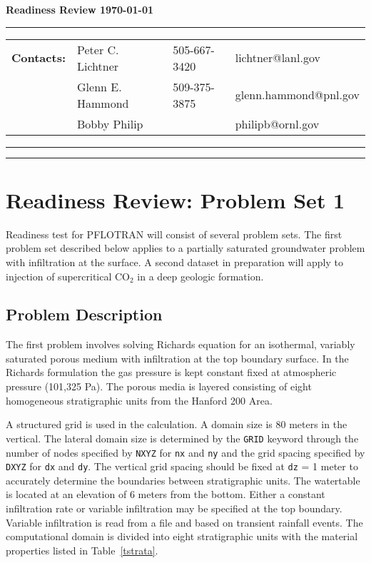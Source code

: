\documentclass[12pt]{article}
\newcommand{\longline}{\noindent\rule[-0.1in]{\textwidth}{0.01in}}
\begin{document}
{\bf\Large Readiness Review \hfill \today}

\longline

\noindent
\begin{tabular}{llll}
{\bf Contacts:} &Peter C. Lichtner & 505-667-3420 & lichtner@lanl.gov\\
&Glenn E. Hammond & 509-375-3875 & glenn.hammond@pnl.gov\\
&Bobby Philip & & philipb@ornl.gov
\end{tabular}

\longline

\tableofcontents

\longline

\section{Readiness Review: Problem Set 1}

Readiness test for PFLOTRAN will consist of several problem sets. The first problem set described below applies to a partially saturated groundwater problem with infiltration at the surface. A second dataset in preparation will apply to injection of supercritical CO$_2$ in a deep geologic formation.

\subsection{Problem Description}

The first problem involves solving Richards equation for an isothermal, variably saturated porous medium with infiltration at the top boundary surface. In the Richards formulation the gas pressure is kept constant fixed at atmospheric pressure (101,325 Pa). The porous media is layered consisting of eight homogeneous stratigraphic units from the Hanford 200 Area.

A structured grid is used in the calculation.
A domain size is 80 meters in the vertical. The lateral domain size is determined by the {\tt GRID} keyword through the number of nodes specified by {\tt NXYZ} for {\tt nx} and {\tt ny} and the grid spacing specified by {\tt DXYZ} for {\tt dx} and {\tt dy}. The vertical grid spacing should be fixed at {\tt dz} = 1 meter to accurately determine the boundaries between stratigraphic units. The watertable is located at an elevation of 6 meters from the bottom. 
Either a constant infiltration rate or variable infiltration may be specified at the top boundary. Variable infiltration is read from a file and based on transient rainfall events.
The computational domain is divided into eight stratigraphic units with the material properties listed in Table~\ref{tstrata}.
\end{document}
